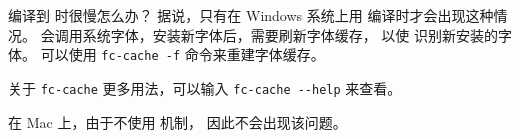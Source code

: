 \begin{myQA}{编译到  时很慢怎么办？}
	据说，只有在 Windows 系统上用  编译时才会出现这种情况。
	 会调用系统字体，安装新字体后，需要刷新字体缓存，
	以使  识别新安装的字体。
	可以使用 \verb|fc-cache -f| 命令来重建字体缓存。
	
	关于 \verb|fc-cache| 更多用法，可以输入 \verb|fc-cache --help| 来查看。
	
	在 Mac 上，由于不使用  机制，
	因此不会出现该问题。
	
\end{myQA}
